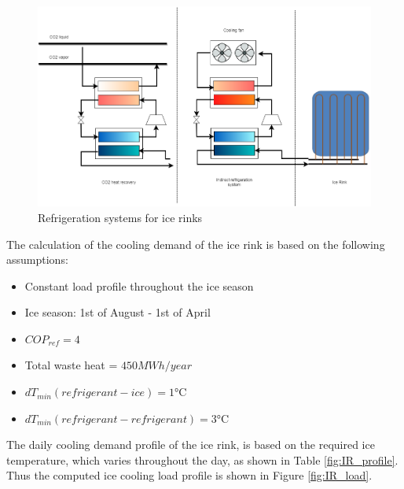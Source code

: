 \documentclass{article}
\begin{document}
\begin{figure}[htp]
	\centering
	\includegraphics[width=1\textwidth]{IceRink_refrigeration.png}
	\caption{Refrigeration systems for ice rinks}
	\label{fig:IR_refSystem}
\end{figure}

The calculation of the cooling demand of the ice rink is based on the following assumptions:
\begin{itemize}
	\item Constant load profile throughout the ice season
	\item Ice season: 1st of August - 1st of April
	\item $COP_{ref} = 4$ \cite{karampourMEASUREMENTMODELLINGICE}
	\item Total waste heat = $ 450 MWh/year$ \cite{kolasniewskiEvaluationModellingIce}
	\item $dT_{min}(refrigerant-ice) = 1 \si{\celsius}$
	\item $dT_{min}(refrigerant-refrigerant) = 3 \si{\celsius}$
\end{itemize}

The daily cooling demand profile of the ice rink, is based on the required ice temperature, which varies throughout the day\cite{karampourMEASUREMENTMODELLINGICE}, as shown in Table \ref{fig:IR_profile}. Thus the computed ice cooling load profile is shown in Figure \ref{fig:IR_load}.
\end{document}
